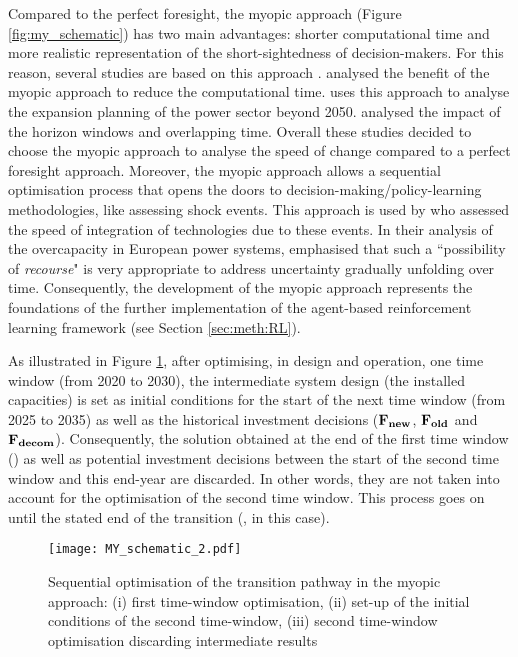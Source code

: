 \noindent
Compared to the perfect foresight, the myopic approach (Figure \ref{fig:my_schematic}) has two main advantages: shorter computational time and more realistic representation of the short-sightedness of decision-makers. For this reason, several studies are based on this approach \citep{babrowski2014reducing,poncelet2016myopic,nerini2017myopic,heuberger2018impact}. \citet{babrowski2014reducing} analysed the benefit of the myopic approach to reduce the computational time. \citet{poncelet2016myopic} uses this approach to analyse the expansion planning of the power sector beyond 2050. \citet{nerini2017myopic} analysed the impact of the horizon windows and overlapping time.  Overall these studies decided to choose the myopic approach to analyse the speed of change compared to a perfect foresight approach.
Moreover, the myopic approach allows a sequential optimisation process that opens the doors to decision-making/policy-learning methodologies, like assessing shock events. This approach is used by \citet{heuberger2018impact} who assessed the speed of integration of technologies due to these events. 
In their analysis of the overcapacity in European power systems, \citet{moret2020overcapacity} emphasised that such a ``possibility of \textit{recourse}" is very appropriate to address uncertainty gradually unfolding over time. Consequently, the development of the myopic approach represents the foundations of the further implementation of the agent-based reinforcement learning framework (see Section \ref{sec:meth:RL}).

As illustrated in Figure \ref{fig:my_schematic_2}, after optimising, in design and operation, one time window (\eg from 2020 to 2030), the intermediate system design (\ie the installed capacities) is set as initial conditions for the start of the next time window (\eg from 2025 to 2035) as well as the historical investment decisions (\ie $\textbf{F\textsubscript{new}}$, $\textbf{F\textsubscript{old}}$ and $\textbf{F\textsubscript{decom}}$). Consequently, the solution obtained at the end of the first time window () as well as potential investment decisions between the start of the second time window and this end-year are discarded. In other words, they are not taken into account for the optimisation of the second time window. This process goes on until the stated end of the transition (, in this case).

\begin{figure}[htbp!]
\centering
\texttt{[image: MY\_schematic\_2.pdf]}
\caption{Sequential optimisation of the transition pathway in the myopic approach: (i) first time-window optimisation, (ii) set-up of the initial conditions of the second time-window, (iii) second time-window optimisation discarding intermediate results}
\label{fig:my_schematic_2}
\end{figure}

